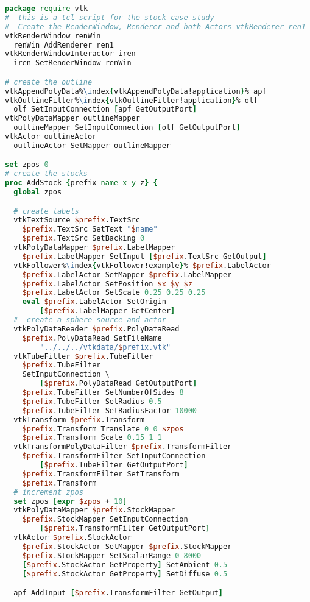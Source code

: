 \begin{lstlisting}[language=TCL, caption={Tcl script for stock case study.}, escapechar=\%]
package require vtk
#  this is a tcl script for the stock case study
#  Create the RenderWindow, Renderer and both Actors vtkRenderer ren1
vtkRenderWindow renWin
  renWin AddRenderer ren1
vtkRenderWindowInteractor iren
  iren SetRenderWindow renWin

# create the outline
vtkAppendPolyData%\index{vtkAppendPolyData!application}% apf
vtkOutlineFilter%\index{vtkOutlineFilter!application}% olf
  olf SetInputConnection [apf GetOutputPort]
vtkPolyDataMapper outlineMapper
  outlineMapper SetInputConnection [olf GetOutputPort]
vtkActor outlineActor
  outlineActor SetMapper outlineMapper

set zpos 0
# create the stocks
proc AddStock {prefix name x y z} {
  global zpos

  # create labels
  vtkTextSource $prefix.TextSrc
    $prefix.TextSrc SetText "$name"
    $prefix.TextSrc SetBacking 0
  vtkPolyDataMapper $prefix.LabelMapper
    $prefix.LabelMapper SetInput [$prefix.TextSrc GetOutput]
  vtkFollower%\index{vtkFollower!example}% $prefix.LabelActor
    $prefix.LabelActor SetMapper $prefix.LabelMapper
    $prefix.LabelActor SetPosition $x $y $z
    $prefix.LabelActor SetScale 0.25 0.25 0.25
    eval $prefix.LabelActor SetOrigin
        [$prefix.LabelMapper GetCenter]
  #  create a sphere source and actor
  vtkPolyDataReader $prefix.PolyDataRead
    $prefix.PolyDataRead SetFileName
		"../../../vtkdata/$prefix.vtk"
  vtkTubeFilter $prefix.TubeFilter
    $prefix.TubeFilter
    SetInputConnection \
        [$prefix.PolyDataRead GetOutputPort]
	$prefix.TubeFilter SetNumberOfSides 8
	$prefix.TubeFilter SetRadius 0.5
    $prefix.TubeFilter SetRadiusFactor 10000
  vtkTransform $prefix.Transform
	$prefix.Transform Translate 0 0 $zpos
	$prefix.Transform Scale 0.15 1 1
  vtkTransformPolyDataFilter $prefix.TransformFilter
    $prefix.TransformFilter SetInputConnection
        [$prefix.TubeFilter GetOutputPort]
    $prefix.TransformFilter SetTransform
    $prefix.Transform
  # increment zpos
  set zpos [expr $zpos + 10]
  vtkPolyDataMapper $prefix.StockMapper
    $prefix.StockMapper SetInputConnection
        [$prefix.TransformFilter GetOutputPort]
  vtkActor $prefix.StockActor
    $prefix.StockActor SetMapper $prefix.StockMapper
    $prefix.StockMapper SetScalarRange 0 8000
    [$prefix.StockActor GetProperty] SetAmbient 0.5
    [$prefix.StockActor GetProperty] SetDiffuse 0.5

  apf AddInput [$prefix.TransformFilter GetOutput]


\end{lstlisting}
